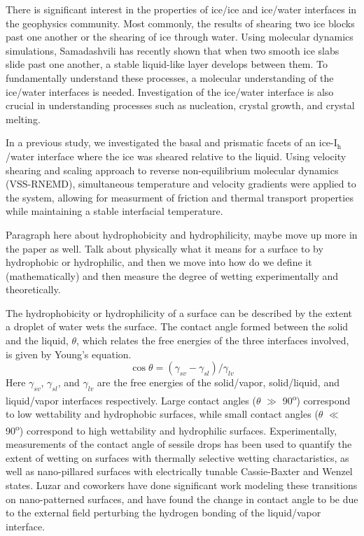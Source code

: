 \documentclass{pnastwo}
\begin{document}
\begin{article}
There is significant interest in the properties of ice/ice and ice/water 
interfaces in the geophysics community. Most commonly, the results of shearing
two ice blocks past one 
another\cite{Casassa91, Sukhorukov13, Pritchard12, Lishman13} or the shearing 
of ice through water\cite{Cuffey99, Bell08}. Using molecular dynamics 
simulations, Samadashvili has recently shown that when two smooth ice slabs 
slide past one another, a stable liquid-like layer develops between 
them\cite{Samadashvili13}. To fundamentally understand these processes, a 
molecular understanding of the ice/water interfaces is needed.     
Investigation of the ice/water interface is also crucial in understanding
processes such as nucleation, crystal 
growth,\cite{Han92, Granasy95, Vanfleet95} and crystal 
melting\cite{Weber83, Han92, Sakai96, Sakai96B}. 
  
In a previous study\cite{Louden13}, we investigated
the basal and prismatic facets of an ice-I$_\mathrm{h}$/water
interface where the ice was sheared relative to the liquid. Using
 velocity shearing and scaling approach to reverse 
non-equilibrium molecular dynamics (VSS-RNEMD), simultaneous temperature and 
velocity gradients were applied to the system, allowing for measurment
of friction and thermal transport properties while maintaining a stable 
interfacial temperature\cite{Kuang12}. 

Paragraph here about hydrophobicity and hydrophilicity, maybe move up
more in the paper as well. Talk about physically what it means for a 
surface to by hydrophobic or hydrophilic, and then we move into
how do we define it (mathematically) and then measure the degree
of wetting experimentally and theoretically.

The hydrophobicity or hydrophilicity of a surface can be described by the
extent a droplet of water wets the surface. The contact angle formed between
the solid and the liquid, $\theta$, which relates the free energies of the 
three interfaces involved, is given by Young's equation.
\begin{equation}\label{young}
\cos\theta = (\gamma_{sv} - \gamma_{sl})/\gamma_{lv}
\end{equation} 
Here $\gamma_{sv}$, $\gamma_{sl}$, and $\gamma_{lv}$ are the free energies
of the solid/vapor, solid/liquid, and liquid/vapor interfaces respectively.
Large contact angles ($\theta$ $\gg$ 90\textsuperscript{o}) correspond to low 
wettability and hydrophobic surfaces, while small contact angles 
($\theta$ $\ll$ 90\textsuperscript{o}) correspond to high wettability and 
hydrophilic surfaces. Experimentally, measurements of the contact angle
of sessile drops has been used to quantify the extent of wetting on surfaces
with thermally selective wetting charactaristics\cite{Tadanaga00,Liu04,Sun04},
as well as nano-pillared surfaces with electrically tunable Cassie-Baxter and 
Wenzel states\cite{Herbertson06,Dhindsa06,Verplanck07,Ahuja08,Manukyan11}. 
Luzar and coworkers have done significant work modeling these transitions on 
nano-patterned surfaces\cite{Daub07,Daub10,Daub11,Ritchie12}, and have found 
the change in contact angle to be due to the external field perturbing the 
hydrogen bonding of the liquid/vapor interface\cite{Daub07}.


\end{article}
\end{document}
